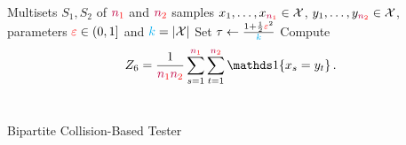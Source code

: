 \begin{algorithm}[ht!]
  \begin{algorithmic}[1]
    \Require Multisets $S_1, S_2$ of $\textcolor{red}{{\textcolor{purple}{n}}_1}$ and $\textcolor{red}{{\textcolor{purple}{n}}_2}$ samples $x_1,\dots,x_{\textcolor{red}{{\textcolor{purple}{n}}_1}}\in \mathcal{X}$, $y_1,\dots,y_{\textcolor{red}{{\textcolor{purple}{n}}_2}}\in \mathcal{X}$, parameters $\textcolor{red}{\varepsilon}\in(0,1]$ and $\ab = \abs{\domain}$
    \State Set $\tau \gets \frac{1+\frac{1}{2}\textcolor{red}{\varepsilon}^2}{{\textcolor{cyan}{k}}}$
    \State Compute 
    \[
        Z_6 = \frac{1}{\nss\nst} \sum_{s=1}^{\nss}\sum_{t=1}^{\nst} \indic{x_s=y_t}\,.
    \]
     \Return \reject {}
    \Else\ 
      \Return \accept {}
    \EndIf
  \end{algorithmic}
  \caption{\label{algo:bipartite:collision-based}\sc Bipartite Collision-Based Tester}
\end{algorithm}

